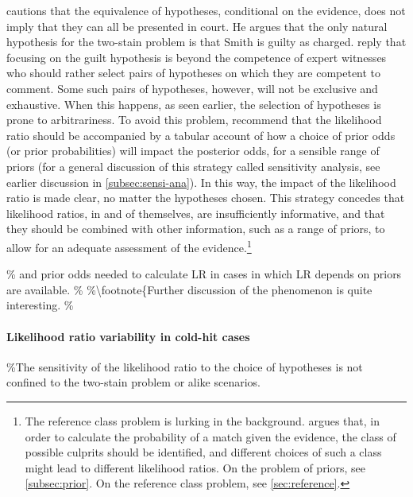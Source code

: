 \documentclass[10pt,dvipsnames,enabledeprecatedfontcommands]{scrartcl}
\let\oldparagraph\paragraph
\renewcommand{\paragraph}[1]{\oldparagraph{#1}\mbox{}}
\begin{document}
\citet{dawid2004likelihood} cautions that the equivalence of hypotheses,
conditional on the evidence, does not imply that they can all be
presented in court. He argues that the only natural hypothesis for the
two-stain problem is that Smith is guilty as charged.
\cite{meester2004ResponseDawidBalding} reply that focusing on the guilt
hypothesis is beyond the competence of expert witnesses who should
rather select pairs of hypotheses on which they are competent to
comment. Some such pairs of hypotheses, however, will not be exclusive
and exhaustive. When this happens, as seen earlier, the selection of
hypotheses is prone to arbitrariness. To avoid this problem,
\cite{meester2004WhyEffectPriora} recommend that the likelihood ratio
should be accompanied by a tabular account of how a choice of prior odds
(or prior probabilities) will impact the posterior odds, for a sensible
range of priors (for a general discussion of this strategy called
sensitivity analysis, see earlier discussion in \ref{subsec:sensi-ana}).
In this way, the impact of the likelihood ratio is made clear, no matter
the hypotheses chosen. This strategy concedes that likelihood ratios, in
and of themselves, are insufficiently informative, and that they should
be combined with other information, such as a range of priors, to allow
for an adequate assessment of the
evidence.\footnote{The reference class problem 
is lurking in the background.  \citet{balding2004comment} argues that, in order to calculate the probability of a match given the evidence, the class of possible culprits should be identified, and  different choices of such a class might lead to different likelihood ratios. On the problem of priors, see \ref{subsec:prior}. On the reference class problem, see \ref{sec:reference}.}

\% and prior odds needed to calculate LR in cases in which LR depends on
priors are available. \% \%\textbackslash{}footnote\{Further discussion
of the phenomenon is quite interesting. \%

\paragraph{Likelihood ratio variability in cold-hit cases}

\%The sensitivity of the likelihood ratio to the choice of hypotheses is
not confined to the two-stain problem or alike scenarios.
\end{document}
